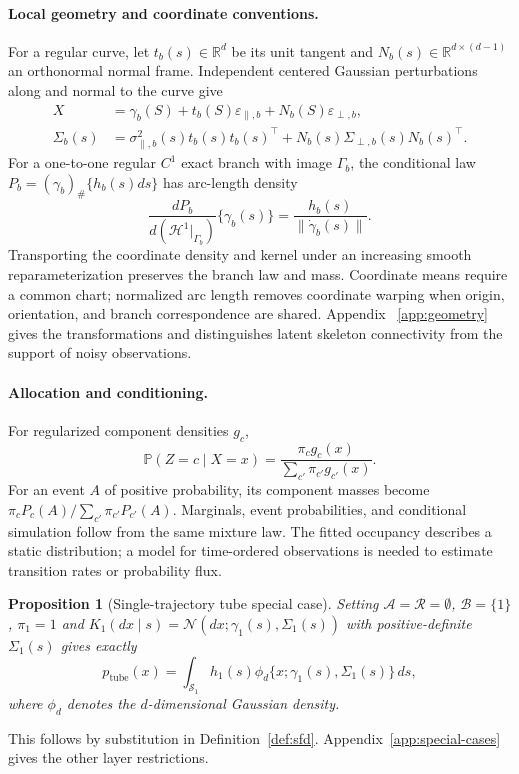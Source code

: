 \documentclass[10pt]{article}
\newcommand{\Pbb}{\mathbb P}
\newcommand{\R}{\mathbb R}
\newcommand{\Normal}{\mathcal N}
\newtheorem{proposition}{Proposition}
\theoremstyle{definition}
\theoremstyle{plain}
\begin{document}
\paragraph{Local geometry and coordinate conventions.}
For a regular curve, let $t_b(s)\in\R^d$ be its unit tangent and
$N_b(s)\in\R^{d\times(d-1)}$ an orthonormal normal frame. Independent
centered Gaussian perturbations along and normal to the curve give
\begin{equation}
 \begin{split}
 X&=\gamma_b(S)+t_b(S)\varepsilon_{\parallel,b}
                      +N_b(S)\varepsilon_{\perp,b},\\
 \Sigma_b(s)&=\sigma_{\parallel,b}^2(s)t_b(s)t_b(s)^\top
                +N_b(s)\Sigma_{\perp,b}(s)N_b(s)^\top.
 \end{split}
 \label{eq:frame}
\end{equation}
For a one-to-one regular $C^1$ exact branch with image $\Gamma_b$, the
conditional law $P_b=(\gamma_b)_\#\{h_b(s)ds\}$ has arc-length density
\begin{equation}
 \frac{dP_b}{d(\mathcal H^1|_{\Gamma_b})}\{\gamma_b(s)\}
       =\frac{h_b(s)}{\|\dot\gamma_b(s)\|}.
 \label{eq:intrinsic}
\end{equation}
Transporting the coordinate density and kernel under an increasing smooth
reparameterization preserves the branch law and mass. Coordinate means
require a common chart; normalized arc length removes coordinate warping
when origin, orientation, and branch correspondence are shared. Appendix~
\ref{app:geometry} gives the transformations and distinguishes latent
skeleton connectivity from the support of noisy observations.

\paragraph{Allocation and conditioning.}
For regularized component densities $g_c$,
\begin{equation}
 \Pbb(Z=c\mid X=x)=\frac{\pi_cg_c(x)}{\sum_{c'}\pi_{c'}g_{c'}(x)}.
 \label{eq:responsibility}
\end{equation}
For an event $A$ of positive probability, its component masses become
$\pi_cP_c(A)/\sum_{c'}\pi_{c'}P_{c'}(A)$. Marginals, event probabilities,
and conditional simulation follow from the same mixture law. The fitted
occupancy describes a static distribution; a model for time-ordered
observations is needed to estimate transition rates or probability flux.

\begin{proposition}[Single-trajectory tube special case]
\label{prop:single-tube}
Setting $\mathcal A=\mathcal R=\emptyset$, $\mathcal B=\{1\}$,
$\pi_1=1$ and
$K_1(dx\mid s)=\Normal(dx;\gamma_1(s),\Sigma_1(s))$ with positive-definite
$\Sigma_1(s)$ gives exactly
\[
 p_{\mathrm{tube}}(x)=\int_{\mathcal S_1}h_1(s)
       \phi_d\{x;\gamma_1(s),\Sigma_1(s)\}\,ds,
\]
where $\phi_d$ denotes the $d$-dimensional Gaussian density.
\end{proposition}
This follows by substitution in Definition~\ref{def:sfd}.
Appendix~\ref{app:special-cases} gives the other layer restrictions.
\end{document}
